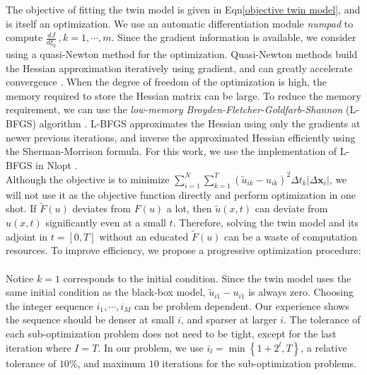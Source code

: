 \documentclass[a4paper,onecolumn]{article}
\theoremstyle{remark}
\begin{document}
\noindent The objective of fitting the twin model is given in Eqn\eqref{objective twin model},
and is itself an optimization.
We use an automatic differentiation module \textit{numpad} \cite{numpad} to compute
$\frac{dJ}{d\xi_k}\,, k=1,\cdots, m$.
Since the gradient information is available, we consider using a quasi-Newton method
for the optimization. Quasi-Newton methods build the Hessian approximation iteratively 
using gradient, and can greatly accelerate convergence \cite{Quasi-Newton Review}.
When the degree of freedom of the optimization is high, the memory required to 
store the Hessian matrix can be large. To reduce the memory requirement, 
we can use the \emph{low-memory Broyden-Fletcher-Goldfarb-Shannon} (L-BFGS) algorithm
\cite{nlopt, LBFGS, Eric master thesis}. 
L-BFGS approximates the Hessian using only the gradients at newer previous iterations,
and inverse the approximated Hessian efficiently using the Sherman-Morrison formula.
For this work, we
use the implementation of L-BFGS in Nlopt \cite{nlopt}.\\

\noindent Although the objective is to minimize 
$
\sum_{i=1}^{N}\sum_{k=1}^{T} \left(\tilde{u}_{ik} - u_{ik}\right)^2 \Delta t_k
\left| \Delta \mathbf{x}_i \right|
$, we will not use it as the objective function directly and perform optimization
in one shot. If $\tilde{F}(u)$ deviates from $F(u)$ a lot, then $\tilde{u}(x,t)$
can deviate from ${u}(x,t)$ significantly even at a small $t$. 
Therefore, solving the twin model and its adjoint in $t=[0,T]$ without
an educated $\tilde{F}(u)$ can be a waste of computation 
resources. To improve efficiency, we propose a progressive optimization
procedure:\\
\\

\noindent Notice $k=1$ corresponds to the initial condition. Since the twin model
uses the same initial condition as the black-box model, $\tilde{u}_{i1} - u_{i1}$
is always zero.
Choosing the integer sequence $i_1,\cdots,i_M$ can be problem dependent.
Our experience shows the sequence should be denser at small $i$, and sparser at larger $i$.
The tolerance of each sub-optimization problem does not need to be tight,
except for the last iteration where $I=T$.
In our problem, we use $i_l = \min\left\{ 1+2^l, T\right\}$,
a relative tolerance of $10\%$, and maximum $10$ iterations for the sub-optimization problems.\\
\end{document}
